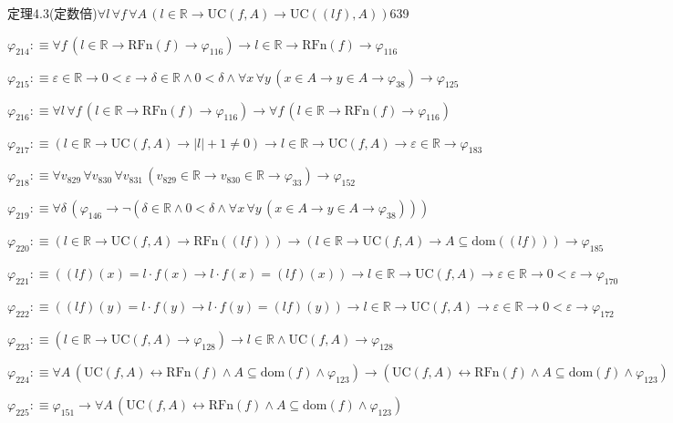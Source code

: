 \begin{fullproof}{定理4.3(定数倍)}{$\forall l\,\forall f\,\forall A\,(l \in \mathbb{R} \to \mathrm{UC}(f,A) \to \mathrm{UC}((l f),A))$}{639}
\begin{abbrevlist}
\item $\varphi_{214} :\equiv \forall f\,(l \in \mathbb{R} \to \mathrm{RFn}(f) \to \varphi_{116}) \to l \in \mathbb{R} \to \mathrm{RFn}(f) \to \varphi_{116}$
\item $\varphi_{215} :\equiv \varepsilon \in \mathbb{R} \to 0 < \varepsilon \to \delta \in \mathbb{R} \land 0 < \delta \land \forall x\,\forall y\,(x \in A \to y \in A \to \varphi_{38}) \to \varphi_{125}$
\item $\varphi_{216} :\equiv \forall l\,\forall f\,(l \in \mathbb{R} \to \mathrm{RFn}(f) \to \varphi_{116}) \to \forall f\,(l \in \mathbb{R} \to \mathrm{RFn}(f) \to \varphi_{116})$
\item $\varphi_{217} :\equiv (l \in \mathbb{R} \to \mathrm{UC}(f,A) \to \lvert l \rvert + 1 \neq 0) \to l \in \mathbb{R} \to \mathrm{UC}(f,A) \to \varepsilon \in \mathbb{R} \to \varphi_{183}$
\item $\varphi_{218} :\equiv \forall v_{829}\,\forall v_{830}\,\forall v_{831}\,(v_{829} \in \mathbb{R} \to v_{830} \in \mathbb{R} \to \varphi_{33}) \to \varphi_{152}$
\item $\varphi_{219} :\equiv \forall \delta\,(\varphi_{146} \to \neg (\delta \in \mathbb{R} \land 0 < \delta \land \forall x\,\forall y\,(x \in A \to y \in A \to \varphi_{38})))$
\item $\varphi_{220} :\equiv (l \in \mathbb{R} \to \mathrm{UC}(f,A) \to \mathrm{RFn}((l f))) \to (l \in \mathbb{R} \to \mathrm{UC}(f,A) \to A \subseteq \mathrm{dom}((l f))) \to \varphi_{185}$
\item $\varphi_{221} :\equiv ((l f)(x) = l \cdot f(x) \to l \cdot f(x) = (l f)(x)) \to l \in \mathbb{R} \to \mathrm{UC}(f,A) \to \varepsilon \in \mathbb{R} \to 0 < \varepsilon \to \varphi_{170}$
\item $\varphi_{222} :\equiv ((l f)(y) = l \cdot f(y) \to l \cdot f(y) = (l f)(y)) \to l \in \mathbb{R} \to \mathrm{UC}(f,A) \to \varepsilon \in \mathbb{R} \to 0 < \varepsilon \to \varphi_{172}$
\item $\varphi_{223} :\equiv (l \in \mathbb{R} \to \mathrm{UC}(f,A) \to \varphi_{128}) \to l \in \mathbb{R} \land \mathrm{UC}(f,A) \to \varphi_{128}$
\item $\varphi_{224} :\equiv \forall A\,(\mathrm{UC}(f,A) \leftrightarrow \mathrm{RFn}(f) \land A \subseteq \mathrm{dom}(f) \land \varphi_{123}) \to (\mathrm{UC}(f,A) \leftrightarrow \mathrm{RFn}(f) \land A \subseteq \mathrm{dom}(f) \land \varphi_{123})$
\item $\varphi_{225} :\equiv \varphi_{151} \to \forall A\,(\mathrm{UC}(f,A) \leftrightarrow \mathrm{RFn}(f) \land A \subseteq \mathrm{dom}(f) \land \varphi_{123})$

\end{abbrevlist}
\end{fullproof}
